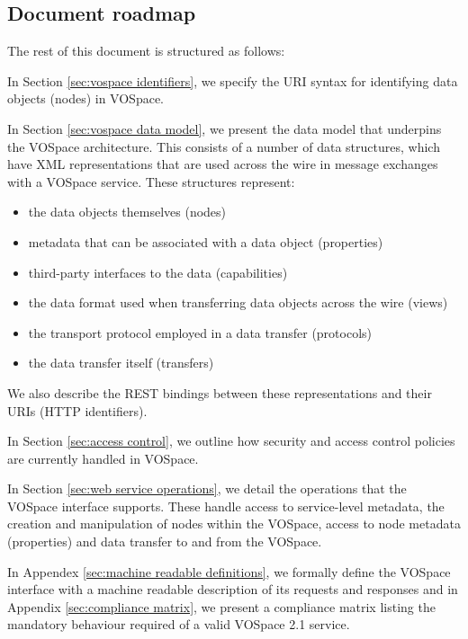 \documentclass[11pt,a4paper]{ivoa}
\begin{document}

\subsection{Document roadmap}
\label{subsec:document roadmap}
The rest of this document is structured as follows:

In Section \ref{sec:vospace identifiers}, we specify the URI syntax for identifying data objects (nodes) in VOSpace.

In Section \ref{sec:vospace data model}, we present the data model that underpins the VOSpace architecture. This consists of a number of data structures, which have XML representations that are used across the wire in message exchanges with a VOSpace service. These structures represent:

\begin{itemize}
    \item the data objects themselves (nodes)
    \item metadata that can be associated with a data object (properties)
    \item third-party interfaces to the data (capabilities)
    \item the data format used when transferring data objects across the wire (views)
    \item the transport protocol employed in a data transfer (protocols)
    \item the data transfer itself (transfers)
\end{itemize}

We also describe the REST bindings between these representations and their URIs (HTTP identifiers).

In Section \ref{sec:access control}, we outline how security and access control policies are currently handled in VOSpace.

In Section \ref{sec:web service operations}, we detail the operations that the VOSpace interface supports. These handle access to service-level metadata, the creation and manipulation of nodes within the VOSpace, access to node metadata (properties) and data transfer to and from the VOSpace.

In Appendex \ref{sec:machine readable definitions}, we formally define the VOSpace interface with a machine readable description of its requests and responses and in Appendix \ref{sec:compliance matrix}, we present a compliance matrix listing the mandatory behaviour required of a valid VOSpace 2.1 service.
\end{document}

